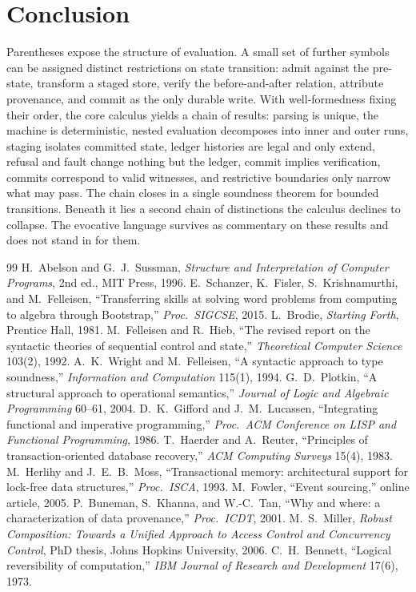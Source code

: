\documentclass[11pt]{article}
\begin{document}
\section{Conclusion}

Parentheses expose the structure of evaluation. A small set of further symbols can be assigned distinct restrictions on state transition: admit against the pre-state, transform a staged store, verify the before-and-after relation, attribute provenance, and commit as the only durable write. With well-formedness fixing their order, the core calculus yields a chain of results: parsing is unique, the machine is deterministic, nested evaluation decomposes into inner and outer runs, staging isolates committed state, ledger histories are legal and only extend, refusal and fault change nothing but the ledger, commit implies verification, commits correspond to valid witnesses, and restrictive boundaries only narrow what may pass. The chain closes in a single soundness theorem for bounded transitions. Beneath it lies a second chain of distinctions the calculus declines to collapse. The evocative language survives as commentary on these results and does not stand in for them.

\begin{thebibliography}{99}
 H.~Abelson and G.~J.~Sussman, \emph{Structure and Interpretation of Computer Programs}, 2nd ed., MIT Press, 1996.
 E.~Schanzer, K.~Fisler, S.~Krishnamurthi, and M.~Felleisen, ``Transferring skills at solving word problems from computing to algebra through Bootstrap,'' \emph{Proc.\ SIGCSE}, 2015.
 L.~Brodie, \emph{Starting Forth}, Prentice Hall, 1981.
 M.~Felleisen and R.~Hieb, ``The revised report on the syntactic theories of sequential control and state,'' \emph{Theoretical Computer Science} 103(2), 1992.
 A.~K.~Wright and M.~Felleisen, ``A syntactic approach to type soundness,'' \emph{Information and Computation} 115(1), 1994.
 G.~D.~Plotkin, ``A structural approach to operational semantics,'' \emph{Journal of Logic and Algebraic Programming} 60--61, 2004.
 D.~K.~Gifford and J.~M.~Lucassen, ``Integrating functional and imperative programming,'' \emph{Proc.\ ACM Conference on LISP and Functional Programming}, 1986.
 T.~Haerder and A.~Reuter, ``Principles of transaction-oriented database recovery,'' \emph{ACM Computing Surveys} 15(4), 1983.
 M.~Herlihy and J.~E.~B.~Moss, ``Transactional memory: architectural support for lock-free data structures,'' \emph{Proc.\ ISCA}, 1993.
 M.~Fowler, ``Event sourcing,'' online article, 2005.
 P.~Buneman, S.~Khanna, and W.-C.~Tan, ``Why and where: a characterization of data provenance,'' \emph{Proc.\ ICDT}, 2001.
 M.~S.~Miller, \emph{Robust Composition: Towards a Unified Approach to Access Control and Concurrency Control}, PhD thesis, Johns Hopkins University, 2006.
 C.~H.~Bennett, ``Logical reversibility of computation,'' \emph{IBM Journal of Research and Development} 17(6), 1973.
\end{thebibliography}
\end{document}
